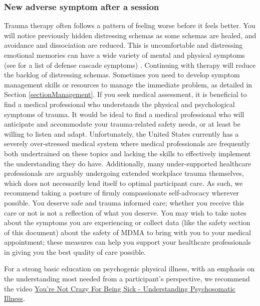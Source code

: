 \documentclass[12pt,letterpaper]{book}
\begin{document}
\subsubsection{New adverse symptom after a session}
Trauma therapy often follows a pattern of feeling worse before it feels better. You will notice previously hidden distressing schemas as some schemas are healed, and avoidance and dissociation are reduced. This is uncomfortable and distressing emotional memories can have a wide variety of mental and physical symptoms (see \textcite{cheetahSigns} for a list of defense cascade symptoms) \cite{kroenkeSomatic,henningsenSomatic}. Continuing with therapy will reduce the backlog of distressing schemas. Sometimes you need to develop symptom management skills or resources to manage the immediate problem, as detailed in Section \ref{sectionManagement}. If you seek medical assessment, it is beneficial to find a medical professional who understands the physical and psychological symptoms of trauma. It would be ideal to find a medical professional who will anticipate and accommodate your trauma-related safety needs, or at least be willing to listen and adapt. Unfortunately, the United States currently has a severely over-stressed medical system where medical professionals are frequently both undertrained on these topics and lacking the skills to effectively implement the understanding they do have. Additionally, many under-supported healthcare professionals are arguably undergoing extended workplace trauma themselves, which does not necessarily lend itself to optimal participant care. As such, we recommend taking a posture of firmly compassionate self-advocacy wherever possible. You deserve safe and trauma informed care; whether you receive this care or not is not a reflection of what you deserve. You may wish to take notes about the symptoms you are experiencing or collect data (like the safety section of this document) about the safety of MDMA to bring with you to your medical appointment; these measures can help you support your healthcare professionals in giving you the best quality of care possible.

For a strong basic education on psychogenic physical illness, with an emphasis on the understanding most needed from a participant's perspective, we recommend the video \href{https://www.youtube.com/watch?v=oHoFqwF2OAU}{You're Not Crazy For Being Sick - Understanding Psychosomatic Illness}.
\end{document}
